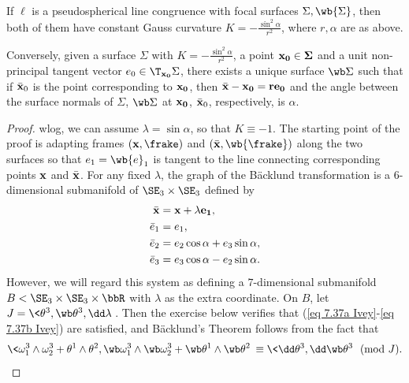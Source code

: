 \begin{thm}[B\"acklund]
    If $\ell$ is a pseudospherical line congruence with focal surfaces $\Sigma,\wb{\Sigma}$, then both of them have constant Gauss curvature $K=-\frac{\sin^2\alpha}{r^2}$, where $r,\alpha$ are as above. 
    
    Conversely, given a surface $\Sigma$ with $K=-\frac{\sin^2\alpha}{r^2}$, a point $\bf{x}_0\in\Sigma$ and a unit non-principal tangent vector $e_0\in \T_{\bf{x}_0}\Sigma$, there exists a unique surface $\wb\Sigma$ such that if $\bar{\bf x}_0$ is the point corresponding to $\bf{x}_0$, then $\bar{\bf{x}}-\bf{x}_0=r e_0$ and the angle between the surface normals of $\Sigma$, $\wb\Sigma$ at $\bf{x}_0$, $\bar{\bf x}_0$, respectively, is $\alpha$.
\end{thm}
\begin{proof}
    \gls{wlog}, we can assume $\lambda=\sin \alpha$, so that $K\equiv -1$. The starting point  of the proof is adapting frames $(\bf{x},\frake)$ and $(\bar{\bf{x}},\wb{\frake})$ along the two surfaces so that $e_1=\wb{e}_1$ is tangent to the line connecting corresponding points $\bf{x}$ and $\bar{\bf x}$. For any fixed $\lambda$, the graph of the B\"acklund transformation is a $6$-dimensional submanifold of $\SE_3\times\SE_3$ defined by 
    \begin{align}
        \bar{\bf x}&= \bf{x}+\lambda e_1,\\
        \bar{e}_1 &= e_1,\\
        \bar{e}_2 &= e_2\cos \alpha+e_3\sin\alpha,\\
        \bar{e}_3&=e_3\cos \alpha-e_2\sin\alpha.
    \end{align} 
    However, we will regard this system as defining a $7$-dimensional submanifold $B<\SE_3\times\SE_3\times\bbR$ with $\lambda$ as the extra coordinate. On $B$, let $J=\<\theta^3,\wb\theta^3,\dd\lambda\>$. Then the exercise below verifies that (\ref{eq 7.37a Ivey}-\ref{eq 7.37b Ivey}) are satisfied, and B\"acklund's Theorem follows from the fact that 
    \[\<\omega^3_1\wedge\omega^3_2+\theta^1\wedge\theta^2,\wb\omega^3_1\wedge\wb\omega^3_2+\wb\theta^1\wedge\wb\theta^2\>\equiv \<\dd\theta^3,\dd\wb\theta^3\>\pmod{J}.\]
\end{proof}



